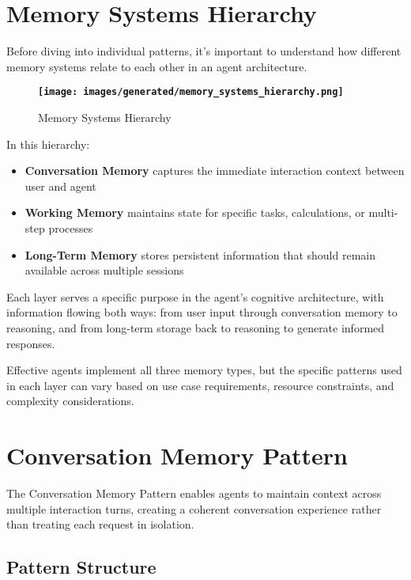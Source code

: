 \documentclass[11pt,oneside]{book}
\providecommand{\pandocbounded}[1]{\textbf{#1}}
\providecommand{\tightlist}{%
  \setlength{\itemsep}{0pt}\setlength{\parskip}{0pt}}
\begin{document}
\section{Memory Systems Hierarchy}\label{memory-systems-hierarchy}

Before diving into individual patterns, it's important to understand how
different memory systems relate to each other in an agent architecture.

\begin{figure}
\centering
\pandocbounded{\texttt{[image: images/generated/memory\_systems\_hierarchy.png]}}
\caption{Memory Systems Hierarchy}
\end{figure}

In this hierarchy:

\begin{itemize}
\tightlist
\item
  \textbf{Conversation Memory} captures the immediate interaction
  context between user and agent
\item
  \textbf{Working Memory} maintains state for specific tasks,
  calculations, or multi-step processes
\item
  \textbf{Long-Term Memory} stores persistent information that should
  remain available across multiple sessions
\end{itemize}

Each layer serves a specific purpose in the agent's cognitive
architecture, with information flowing both ways: from user input
through conversation memory to reasoning, and from long-term storage
back to reasoning to generate informed responses.

Effective agents implement all three memory types, but the specific
patterns used in each layer can vary based on use case requirements,
resource constraints, and complexity considerations.

\section{Conversation Memory Pattern}\label{conversation-memory-pattern}

The Conversation Memory Pattern enables agents to maintain context
across multiple interaction turns, creating a coherent conversation
experience rather than treating each request in isolation.

\subsection{Pattern Structure}\label{pattern-structure-5}
\end{document}
